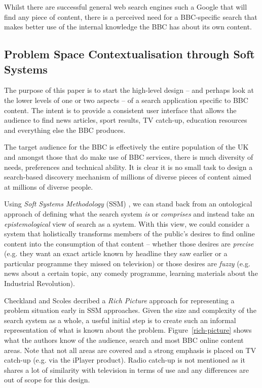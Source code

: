 \documentclass{llncs}
\begin{document}
Whilst there are successful general web search engines such a Google that
will find any piece of content, there is a perceived need for a
BBC-specific search that makes better use of the internal knowledge the BBC
has about its own content.

\subsection{Problem Space Contextualisation through Soft Systems}

The purpose of this paper is to start the high-level design -- and perhaps
look at the lower levels of one or two aspects -- of a search application
specific to BBC content. The intent is to provide a consistent user interface
that allows the audience to find news articles, sport results,
TV catch-up, education resources and everything else the BBC produces.

The target audience for the BBC is effectively the entire population of the UK
and amongst those that do make use of BBC services, there is much diversity
of needs, preferences and technical ability. It is clear it is no small
task to design a search-based discovery mechanism of millions of diverse
pieces of content aimed at millions of diverse people.

Using \emph{Soft Systems Methodology} (SSM)
\cite{checkland2006learning}, we can stand back from
an ontological approach of defining what the search system \emph{is} or
\emph{comprises} and instead take an \emph{epistemological} view of search
as a system. With this view, we could consider a system that holistically
transforms members of the public's desires to find online content into
the consumption of that content -- whether those desires are \emph{precise}
(e.g. they want an exact article known by headline they saw earlier or a
particular programme they missed on television) or those desires are
\emph{fuzzy} (e.g. news about a certain topic, any comedy programme, learning
materials about the Industrial Revolution).

Checkland and Scoles\cite{checkland1990soft} decribed a \emph{Rich Picture} approach
for representing a problem situation early in SSM approaches.
Given the size and complexity of the
search system as a whole, a useful initial step is to create such an informal
representation of what is known about the problem. Figure~\ref{rich-picture}
shows what the authors know of the audience, search and most BBC online content areas.
Note that not all areas are covered and a strong emphasis is placed on TV
catch-up (e.g. via the iPlayer product). Radio catch-up is not mentioned
as it shares a lot of similarity with television in terms of use and any
differences are out of scope for this design.
\end{document}
